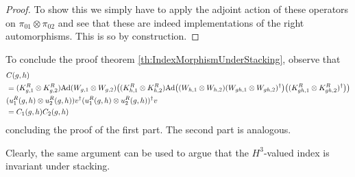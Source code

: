 \documentclass[11pt,a4paper,twoside]{article}
\numberwithin{equation}{section}
\begin{document}
	\begin{proof}
		To show this we simply have to apply the adjoint action of these operators on $\pi_{01}\otimes\pi_{02}$ and see that these are indeed implementations of the right automorphisms. This is so by construction.
	\end{proof}
	To conclude the proof theorem \ref{th:IndexMorphismUnderStacking}, observe that
	\begin{align}
		&C(g,h)\\
		\nonumber
		&=(K_{g,1}^R\otimes K_{g,2}^R)\Ad{W_{g,1}\otimes W_{g,2}}\left((K_{h,1}^R\otimes K_{h,2}^R)\Ad{(W_{h,1}\otimes W_{h,2})(W_{gh,1}\otimes W_{gh,2})^\dagger}\left((K_{gh,1}^R\otimes K_{gh,2}^R)^\dagger\right)\right)\\
		&(u^R_1(g,h)\otimes u^R_2(g,h))v^\dagger (u^R_1(g,h)\otimes u^R_2(g,h))^\dagger v\\
		&=C_1(g,h)C_2(g,h)
	\end{align}
	concluding the proof of the first part. The second part is analogous.
	\begin{remark}\label{rem:StackingH3ValuedIndex}
		Clearly, the same argument can be used to argue that the $H^3$-valued index is invariant under stacking.
	\end{remark}
\end{document}
